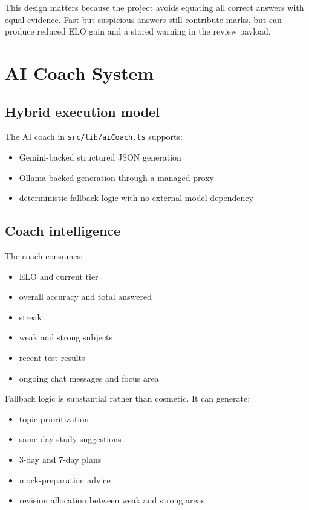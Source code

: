 \documentclass[10pt,twocolumn,a4paper]{article}
\newcommand{\tech}[1]{\texttt{#1}}
\begin{document}
This design matters because the project avoids equating all correct answers with equal evidence. Fast but suspicious answers still contribute marks, but can produce reduced ELO gain and a stored warning in the review payload.

\section{AI Coach System}
\subsection{Hybrid execution model}
The AI coach in \tech{src/lib/aiCoach.ts} supports:
\begin{itemize}
  \item Gemini-backed structured JSON generation
  \item Ollama-backed generation through a managed proxy
  \item deterministic fallback logic with no external model dependency
\end{itemize}

\subsection{Coach intelligence}
The coach consumes:
\begin{itemize}
  \item ELO and current tier
  \item overall accuracy and total answered
  \item streak
  \item weak and strong subjects
  \item recent test results
  \item ongoing chat messages and focus area
\end{itemize}

Fallback logic is substantial rather than cosmetic. It can generate:
\begin{itemize}
  \item topic prioritization
  \item same-day study suggestions
  \item 3-day and 7-day plans
  \item mock-preparation advice
  \item revision allocation between weak and strong areas
\end{itemize}
\end{document}
